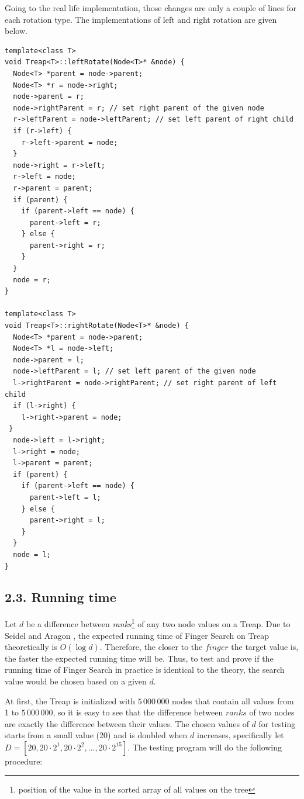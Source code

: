 \documentclass[12pt,english,]{article}
\begin{document}
Going to the real life implementation, those changes are only a couple
of lines for each rotation type. The implementations of left and right
rotation are given below.

\begin{lstlisting}
template<class T>
void Treap<T>::leftRotate(Node<T>* &node) {
  Node<T> *parent = node->parent;
  Node<T> *r = node->right;
  node->parent = r;
  node->rightParent = r; // set right parent of the given node
  r->leftParent = node->leftParent; // set left parent of right child 
  if (r->left) {
    r->left->parent = node;
  }
  node->right = r->left;
  r->left = node;
  r->parent = parent;
  if (parent) {
    if (parent->left == node) {
      parent->left = r;
    } else {
      parent->right = r;
    }
  }
  node = r;
}

template<class T>
void Treap<T>::rightRotate(Node<T>* &node) {
  Node<T> *parent = node->parent;
  Node<T> *l = node->left;
  node->parent = l;
  node->leftParent = l; // set left parent of the given node
  l->rightParent = node->rightParent; // set right parent of left child 
  if (l->right) {
    l->right->parent = node;
 }
  node->left = l->right;
  l->right = node;
  l->parent = parent;
  if (parent) {
    if (parent->left == node) {
      parent->left = l;
    } else {
      parent->right = l;
    }
  }
  node = l;
}
\end{lstlisting}

\hypertarget{running-time}{%
\subsection{2.3. Running time}\label{running-time}}

Let \(d\) be a difference between \emph{ranks}\footnote{position of the
  value in the sorted array of all values on the tree} of any two node
values on a Treap. Due to Seidel and Aragon \cite{1}, the expected
running time of Finger Search on Treap theoretically is \(O(\log d)\).
Therefore, the closer to the \(finger\) the target value is, the faster
the expected running time will be. Thus, to test and prove if the
running time of Finger Search in practice is identical to the theory,
the search value would be chosen based on a given \(d\).

At first, the Treap is initialized with \(5\,000\,000\) nodes that
contain all values from 1 to \(5\,000\,000\), so it is easy to see that
the difference between \(ranks\) of two nodes are exactly the difference
between their values. The chosen values of \(d\) for testing starts from
a small value (20) and is doubled when \(d\) increases, specifically let
\(D = [20, 20\cdot2^1, 20\cdot2^2, \ldots, 20\cdot2^{15}]\). The testing
program will do the following procedure: \vspace{-4mm}
\end{document}
